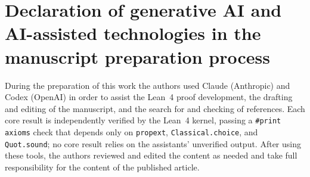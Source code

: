\section*{Declaration of generative AI and AI-assisted technologies in the manuscript
preparation process}
During the preparation of this work the authors used Claude (Anthropic) and Codex
(OpenAI) in order to assist the Lean~4 proof development, the drafting and editing of the
manuscript, and the search for and checking of references. Each core result is independently verified by the Lean~4 kernel, passing a
\texttt{\#print axioms} check that depends only on \texttt{propext},
\texttt{Classical.choice}, and \texttt{Quot.sound}; no core result relies on the
assistants' unverified output. After using these tools, the authors reviewed and edited
the content as needed and take full responsibility for the content of the published
article.
